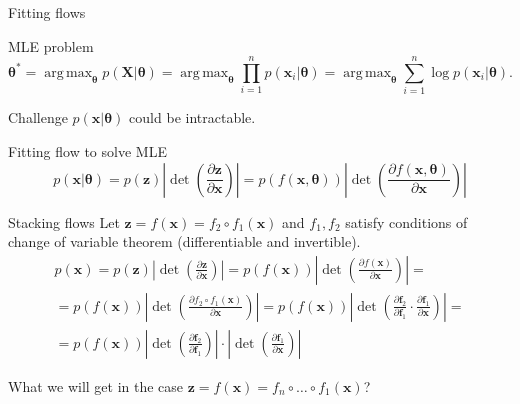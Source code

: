 \documentclass{beamer}
\newcommand{\bx}{\mathbf{x}}
\newcommand{\bz}{\mathbf{z}}
\newcommand{\bX}{\mathbf{X}}
\newcommand{\btheta}{\boldsymbol{\theta}}
\DeclareMathOperator*{\argmax}{arg\,max}
\begin{document}
\begin{frame}{Fitting flows}
	\begin{block}{MLE problem}
		\vspace{-0.3cm}
		\[
		\btheta^* = \argmax_{\btheta} p(\bX | \btheta) = \argmax_{\btheta} \prod_{i=1}^n p(\bx_i | \btheta) = \argmax_{\btheta} \sum_{i=1}^n \log p(\bx_i | \btheta).
		\]
		\vspace{-0.3cm}
	\end{block}
	\begin{block}{Challenge}
		$p(\bx | \btheta)$ could be intractable.
	\end{block}
	\begin{block}{Fitting flow to solve MLE}
		\[
		p(\bx|\btheta) = p(\bz) \left|\det \left(  \frac{\partial \bz}{\partial \bx} \right) \right|  = p(f(\bx, \btheta)) \left|\det \left( \frac{\partial f(\bx, \btheta)}{\partial \bx} \right) \right|
		\]
	\end{block}
\end{frame}
\begin{frame}{Stacking flows}
	Let $\bz = f(\bx) = f_2 \circ f_1(\bx)$ and $f_1, f_2$ satisfy conditions of change of variable theorem (differentiable and invertible).
	\begin{multline*}
		p(\bx) = p(\bz) \left|\det \left(  \frac{\partial \bz}{\partial \bx} \right) \right| = p(f(\bx)) \left|\det \left(  \frac{\partial f(\bx)}{\partial \bx} \right) \right| = \\
		= p(f(\bx)) \left|\det \left(\frac{\partial f_2 \circ f_1(\bx)}{\partial \bx} \right) \right| =
		p(f(\bx)) \left|\det \left(\frac{\partial \textbf{f}_2}{\partial \textbf{f}_1} \cdot \frac{\partial \textbf{f}_1}{\partial \bx} \right) \right| = \\
		= p(f(\bx))  \left|\det \left(\frac{\partial \textbf{f}_2}{\partial \textbf{f}_1} \right) \right| \cdot \left| \det \left( \frac{\partial \textbf{f}_1}{\partial \bx} \right) \right|
	\end{multline*}

	What we will get in the case $\bz = f(\bx) = f_n \circ \dots \circ f_1(\bx)$?
\end{frame}
\end{document}
